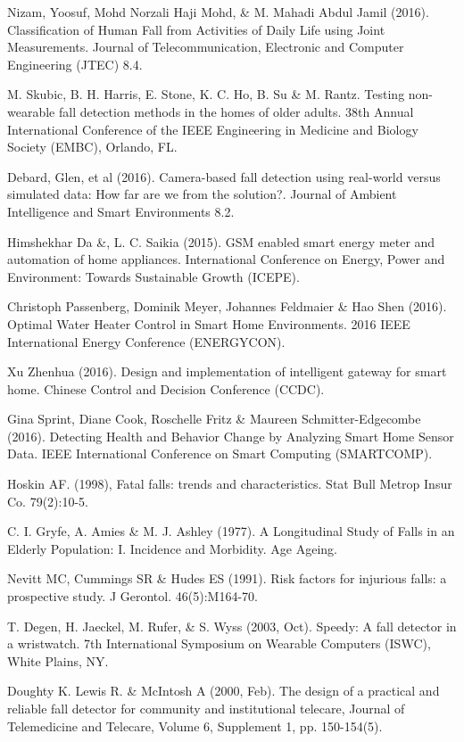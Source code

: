 \begin{thebibliography}{}
Nizam, Yoosuf, Mohd Norzali Haji Mohd, \& M. Mahadi Abdul Jamil (2016). Classification of Human Fall from Activities of Daily Life using Joint Measurements. Journal of Telecommunication, Electronic and Computer Engineering (JTEC) 8.4.

M. Skubic, B. H. Harris, E. Stone, K. C. Ho, B. Su \& M. Rantz. Testing non-wearable fall detection methods in the homes of older adults. 38th Annual International Conference of the IEEE Engineering in Medicine and Biology Society (EMBC), Orlando, FL.

Debard, Glen, et al (2016). Camera-based fall detection using real-world versus simulated data: How far are we from the solution?. Journal of Ambient Intelligence and Smart Environments 8.2.

Himshekhar Da \&, L. C. Saikia (2015). GSM enabled smart energy meter and automation of home appliances. International Conference on Energy, Power and Environment: Towards Sustainable Growth (ICEPE).

Christoph Passenberg, Dominik Meyer, Johannes Feldmaier \& Hao Shen (2016). Optimal Water Heater Control in Smart Home Environments. 2016 IEEE International Energy Conference (ENERGYCON).

Xu Zhenhua (2016). Design and implementation of intelligent gateway for smart home. Chinese Control and Decision Conference (CCDC).

Gina Sprint, Diane Cook, Roschelle Fritz \& Maureen Schmitter-Edgecombe (2016). Detecting Health and Behavior Change by Analyzing Smart Home Sensor Data. IEEE International Conference on Smart Computing (SMARTCOMP).

Hoskin AF. (1998), Fatal falls: trends and characteristics. Stat Bull Metrop Insur Co. 79(2):10-5.

C. I. Gryfe, A. Amies \& M. J. Ashley (1977). A Longitudinal Study of Falls in an Elderly Population: I. Incidence and Morbidity. Age Ageing.

Nevitt MC, Cummings SR \& Hudes ES (1991). Risk factors for injurious falls: a prospective study. J Gerontol. 46(5):M164-70.

T. Degen, H. Jaeckel, M. Rufer, \& S. Wyss (2003, Oct). Speedy: A fall detector in a wristwatch. 7th International Symposium on Wearable Computers (ISWC), White Plains, NY.

Doughty K. Lewis R. \& McIntosh A (2000, Feb). The design of a practical and reliable fall detector for community and institutional telecare, Journal of Telemedicine and Telecare, Volume 6, Supplement 1, pp. 150-154(5). 


\end{thebibliography}
